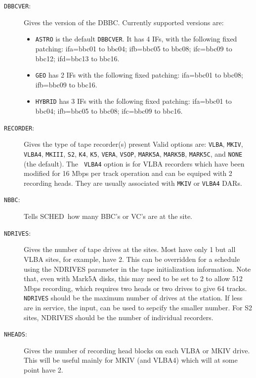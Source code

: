 \documentclass{report}
\newcommand{\schedb}{{\sc SCHED~}}
\begin{document}
\begin{description}
\item [{\tt DBBCVER}: \label{ST:DBBCVER}] Gives the version of the DBBC.
Currently supported versions are:
\begin{itemize} 
      \item {\tt ASTRO} is the default {\tt DBBCVER}. It has 4
            IFs, with the following fixed patching: ifa=bbc01 to
            bbc04; ifb=bbc05 to bbc08; ifc=bbc09 to bbc12;
            ifd=bbc13 to bbc16. 
      \item {\tt GEO} has 2 IFs with the following fixed patching:
            ifa=bbc01 to bbc08; ifb=bbc09 to bbc16.
      \item {\tt HYBRID} has 3 IFs with the following fixed
            patching: ifa=bbc01 to bbc04; ifb=bbc05 to bbc08;
            ifc=bbc09 to bbc16.
\end{itemize}

\item [{\tt RECORDER}:] Gives the type of tape recorder(s) present
Valid options are: {\tt VLBA}, {\tt MKIV}, {\tt VLBA4}, {\tt MKIII},
{\tt S2}, {\tt K4}, {\tt K5}, {\tt VERA}, {\tt VSOP}, {\tt MARK5A},
{\tt MARK5B}, {\tt MARK5C}, and {\tt NONE} (the default).  The {\tt
VLBA4} option is for VLBA recorders which have been modified for 16
Mbps per track operation and can be equiped with 2 recording heads.
They are usually associated with {\tt MKIV} or {\tt VLBA4} DARs.

\item[{\tt NBBC}:] Tells \schedb how many BBC's or VC's are at the
site.

\item[{\tt NDRIVES}:] Gives the number of tape drives at the sites.
Most have only 1 but all VLBA sites, for example, have 2.  This can be
overridden for a schedule using the NDRIVES parameter in the tape
initialization information.  Note that, even with Mark5A disks, this
may need to be set to 2 to allow 512 Mbps recording, which requires
two heads or two drives to give 64 tracks.  {\tt NDRIVES} should be
the maximum number of drives at the station.  If less are in service,
the  input,  can be used to sepcify the smaller number.  For
S2 sites, NDRIVES should be the number of individual recorders.

\item[{\tt NHEADS}:] Gives the number of recording head blocks on
each VLBA or MKIV drive.  This will be useful mainly for MKIV
(and VLBA4) which will at some point have 2.


\end{description}
\end{document}
